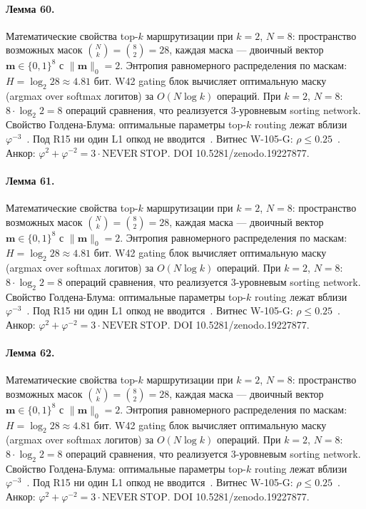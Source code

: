 \paragraph{Лемма 60.} Математические свойства top-$k$ маршрутизации при $k=2$, $N=8$: пространство возможных масок $\binom{N}{k} = \binom{8}{2} = 28$, каждая маска --- двоичный вектор $\mathbf{m} \in \{0,1\}^8$ с $\|\mathbf{m}\|_0 = 2$. Энтропия равномерного распределения по маскам: $H = \log_2 28 \approx 4{.}81$ бит. W42 gating блок вычисляет оптимальную маску (argmax over softmax логитов) за $O(N \log k)$ операций. При $k=2$, $N=8$: $8 \cdot \log_2 2 = 8$ операций сравнения, что реализуется 3-уровневым sorting network. Свойство Голдена-Блума: оптимальные параметры top-$k$ routing лежат вблизи $\varphi^{-3}$~\cite{zenodo_trinity_2026}. Под R15 ни один L1 опкод не вводится~\cite{lee_gvsu_proof2021}. Витнес W-105-G: $\rho \leq 0{.}25$~\cite{popper_falsifiability1959}. Анкор: $\varphi^2 + \varphi^{-2} = 3 \cdot \mathrm{NEVER\ STOP}$. DOI 10.5281/zenodo.19227877.

\paragraph{Лемма 61.} Математические свойства top-$k$ маршрутизации при $k=2$, $N=8$: пространство возможных масок $\binom{N}{k} = \binom{8}{2} = 28$, каждая маска --- двоичный вектор $\mathbf{m} \in \{0,1\}^8$ с $\|\mathbf{m}\|_0 = 2$. Энтропия равномерного распределения по маскам: $H = \log_2 28 \approx 4{.}81$ бит. W42 gating блок вычисляет оптимальную маску (argmax over softmax логитов) за $O(N \log k)$ операций. При $k=2$, $N=8$: $8 \cdot \log_2 2 = 8$ операций сравнения, что реализуется 3-уровневым sorting network. Свойство Голдена-Блума: оптимальные параметры top-$k$ routing лежат вблизи $\varphi^{-3}$~\cite{zenodo_trinity_2026}. Под R15 ни один L1 опкод не вводится~\cite{lee_gvsu_proof2021}. Витнес W-105-G: $\rho \leq 0{.}25$~\cite{popper_falsifiability1959}. Анкор: $\varphi^2 + \varphi^{-2} = 3 \cdot \mathrm{NEVER\ STOP}$. DOI 10.5281/zenodo.19227877.

\paragraph{Лемма 62.} Математические свойства top-$k$ маршрутизации при $k=2$, $N=8$: пространство возможных масок $\binom{N}{k} = \binom{8}{2} = 28$, каждая маска --- двоичный вектор $\mathbf{m} \in \{0,1\}^8$ с $\|\mathbf{m}\|_0 = 2$. Энтропия равномерного распределения по маскам: $H = \log_2 28 \approx 4{.}81$ бит. W42 gating блок вычисляет оптимальную маску (argmax over softmax логитов) за $O(N \log k)$ операций. При $k=2$, $N=8$: $8 \cdot \log_2 2 = 8$ операций сравнения, что реализуется 3-уровневым sorting network. Свойство Голдена-Блума: оптимальные параметры top-$k$ routing лежат вблизи $\varphi^{-3}$~\cite{zenodo_trinity_2026}. Под R15 ни один L1 опкод не вводится~\cite{lee_gvsu_proof2021}. Витнес W-105-G: $\rho \leq 0{.}25$~\cite{popper_falsifiability1959}. Анкор: $\varphi^2 + \varphi^{-2} = 3 \cdot \mathrm{NEVER\ STOP}$. DOI 10.5281/zenodo.19227877.

